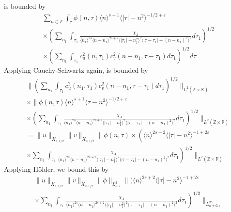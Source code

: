 \documentclass[12pt,reqno]{amsart}
\numberwithin{equation}{section}  %
\renewcommand{\cref}{\Cref}
\newcommand{\rr}{\mathbb{R}}
\newcommand{\zz}{\mathbb{Z}}
\newcommand{\zzdot}{\dot{\zz}}
\newcommand{\ee}{\varepsilon}
\begin{document}
%
is bounded by 
%
%
\begin{equation}
	\label{10g}
	\begin{split}
    & \sum_{n \in \zzdot} \int_{\tau} \phi(n, \tau) \langle n \rangle ^{s+1}
    \langle | \tau | - n^{2} \rangle ^{-1/2+\ee}
    \\
    & \times \left( \sum_{n_{1}} \int_{\tau_{1}}
    \frac{\chi_{A}}{\langle n_{1} \rangle ^{2s} \langle n-n_{1} \rangle ^{2s+2} \langle |
    \tau_{1} | - n_{1}^{2}\rangle^{2}  \langle | \tau - \tau_{1} | -
    (n - n_{1})^{2} \rangle^{2}} d \tau_{1} \right)^{1/2}
    \\
    & \times \left( \sum_{n_{1}} \int_{\tau_{1}} c_{u}^{2}(n, \tau_{1})
    c_{v}^{2}(n - n_{1}, \tau - \tau_{1}) d \tau_{1} \right)^{1/2} d \tau
  \end{split}
\end{equation}
%
%
Applying Cauchy-Schwartz again, \cref{10g} is bounded by
%
%
\begin{equation*}
  \begin{split}
    & \|\left( \sum_{n_{1}}\int_{\tau_{1}} c_{u}^{2}(n_1, \tau_1)
  c_{v}^{2} (n - n_1, \tau - \tau_{1} ) d \tau_1  \right)^{1/2} \|_{L^{2}(\zzdot \times
		\rr)}
		\\
    & \times  \|\phi(n, \tau)  \langle n
    \rangle ^{s+1} \langle \tau - n^{2} \rangle ^{-1/2+\ee}
		\\
    & \times \left( \sum_{n_{1}} \int_{\tau_{1}} \frac{\chi_{A}}{\langle n_{1}
    \rangle ^{2s} \langle n-n_{1} \rangle ^{2s+2} \langle | \tau_{1}|-n_{1}^{2}
    \rangle^{2} \langle  |\tau -
    \tau_{1} | -(n - n_{1})^{2}
    \rangle^{2}} d \tau_1 \right)^{1/2} \|_{L^2(\zzdot \times \rr)}
		\\
    & = \|u\|_{X_{s,1/2}} \|v\|_{X_{s,1/2}} \label{holder-term}
     \|\phi(n, \tau) \times \left(  \langle n
     \rangle ^{2s+2} \langle |\tau| - n^{2} \rangle^{-1 + 2\ee}  \right .
    \\
    & \times \left . \sum_{n_{1}} \int_{\tau_{1}} \frac{\chi_{A}}{\langle n_{1} \rangle ^{2s} \langle
n-n_{1} \rangle ^{2s+2}  \langle | \tau_{1}|-n_{1}^{2} \rangle^{2} \langle  |\tau -
    \tau_{1} | -(n - n_{1})^{2}
    \rangle^{2}} d \tau_1 \right)^{1/2} \|_{L^2(\zzdot \times \rr)}.
  \end{split}
\end{equation*}
%
Applying H{\"o}lder, we bound this by 
%
%
\begin{equation}
  \label{integral-bound-1st-form-per}
	\begin{split}
    & \|u\|_{X_{s,1/2}} \|v\|_{X_{s,1/2}} \| \phi \|_{L^{2}_{n, \tau}}
    \|\bigg (  \langle n
    \rangle ^{2s+2} \langle | \tau | - n^{2} \rangle ^{-1 + 2\ee}
    \\
    & \times \left. 
    \sum_{n_{1}} \int_{\tau_{1}} \frac{\chi_{A}}{\langle n_{1} \rangle ^{2s} \langle
n-n_{1} \rangle ^{2s+2} \langle | \tau_{1}|-n_{1}^{2} \rangle^{2} \langle  |\tau -
    \tau_{1} | -(n - n_{1})^{2}
    \rangle^{2}} d \tau_1 \right)^{1/2} \|_{L^\infty_{n \neq 0, \tau}}
	\end{split}
\end{equation}
\end{document}
